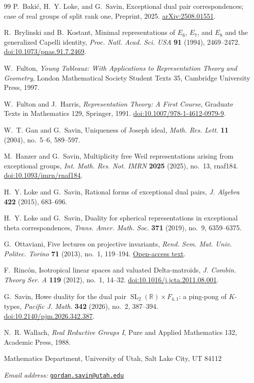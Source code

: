 \documentclass[11pt]{article}
\newcommand{\R}{\mathbb R}
\newcommand{\SL}{\operatorname{SL}}
\theoremstyle{definition}
\numberwithin{equation}{section}
\begin{document}
\begin{thebibliography}{99}
P.~Baki\'c, H.~Y. Loke, and G.~Savin,
Exceptional dual pair correspondences; case of real groups of split rank one,
Preprint, 2025.
\href{https://arxiv.org/abs/2508.01551}{arXiv:2508.01551}.

R.~Brylinski and B.~Kostant,
Minimal representations of $E_6$, $E_7$, and $E_8$ and the generalized
Capelli identity,
\emph{Proc. Natl. Acad. Sci. USA} \textbf{91} (1994), 2469--2472.
\href{https://doi.org/10.1073/pnas.91.7.2469}{doi:10.1073/pnas.91.7.2469}.

W.~Fulton, \emph{Young Tableaux: With Applications to Representation
Theory and Geometry}, London Mathematical Society Student Texts 35,
Cambridge University Press, 1997.

W.~Fulton and J.~Harris, \emph{Representation Theory: A First Course},
Graduate Texts in Mathematics 129, Springer, 1991.
\href{https://doi.org/10.1007/978-1-4612-0979-9}{doi:10.1007/978-1-4612-0979-9}.

W.~T. Gan and G.~Savin, Uniqueness of Joseph ideal,
\emph{Math. Res. Lett.} \textbf{11} (2004), no.~5--6, 589--597.

M.~Hanzer and G.~Savin,
Multiplicity free Weil representations arising from exceptional groups,
\emph{Int. Math. Res. Not. IMRN} \textbf{2025} (2025), no.~13, rnaf184.
\href{https://doi.org/10.1093/imrn/rnaf184}{doi:10.1093/imrn/rnaf184}.

H.~Y. Loke and G.~Savin, Rational forms of exceptional dual pairs,
\emph{J. Algebra} \textbf{422} (2015), 683--696.

H.~Y. Loke and G.~Savin,
Duality for spherical representations in exceptional theta correspondences,
\emph{Trans. Amer. Math. Soc.} \textbf{371} (2019), no.~9, 6359--6375.

G.~Ottaviani, Five lectures on projective invariants,
\emph{Rend. Sem. Mat. Univ. Politec. Torino} \textbf{71} (2013),
no.~1, 119--194.
\href{https://seminariomatematico.polito.it/rendiconti/71-1/119.pdf}{Open-access text}.

F.~Rinc\'on, Isotropical linear spaces and valuated Delta-matroids,
\emph{J. Combin. Theory Ser. A} \textbf{119} (2012), no.~1, 14--32.
\href{https://doi.org/10.1016/j.jcta.2011.08.001}{doi:10.1016/j.jcta.2011.08.001}.

G.~Savin, Howe duality for the dual pair $\SL_2(\R)\times F_{4,1}$:
a ping-pong of $K$-types,
\emph{Pacific J. Math.} \textbf{342} (2026), no.~2, 387--394.
\href{https://doi.org/10.2140/pjm.2026.342.387}{doi:10.2140/pjm.2026.342.387}.

N.~R. Wallach, \emph{Real Reductive Groups I},
Pure and Applied Mathematics 132, Academic Press, 1988.
\end{thebibliography}

\bigskip
{\small
\noindent Mathematics Department, University of Utah, Salt Lake City, UT 84112\par
\noindent\textit{Email address:}
\href{mailto:gordan.savin@utah.edu}{\texttt{gordan.savin@utah.edu}}\par
}
\end{document}
